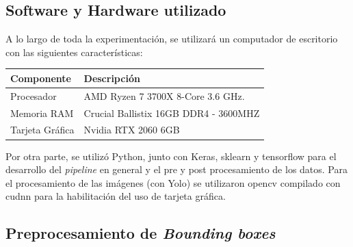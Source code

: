\subsection{Software y Hardware utilizado}
A lo largo de toda la experimentación, se utilizará un computador de escritorio con las siguientes características:

\begin{table}[h!]
\footnotesize
\begin{tabular}{|l|l|}
\hline
\textbf{Componente} & \textbf{Descripción} \\ \hline
Procesador & AMD Ryzen 7 3700X 8-Core 3.6 GHz. \\ \hline
Memoria RAM & Crucial Ballistix 16GB DDR4 - 3600MHZ \\ \hline
Tarjeta Gráfica & Nvidia RTX 2060 6GB \\ \hline
\end{tabular}
\end{table}

Por otra parte, se utilizó Python, junto con Keras, sklearn y tensorflow para el desarrollo del \textit{pipeline} en general y el pre y post procesamiento de los datos. Para el procesamiento de las imágenes (con Yolo) se utilizaron opencv compilado con cudnn para la habilitación del uso de tarjeta gráfica. 

\subsection{Preprocesamiento de \textit{Bounding boxes}}

